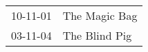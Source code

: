\begin{supertabular}{p{0.07\textwidth}p{0.23\textwidth}}
 10-11-01 &  The Magic Bag \\
 03-11-04 &  The Blind Pig \\
\end{supertabular}
